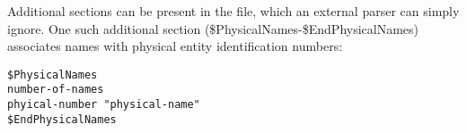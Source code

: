 Additional sections can be present in the file, which an external parser can simply ignore. One such additional section (\$PhysicalNames-\$EndPhysicalNames) associates names with physical entity identification numbers:
 	
\begin{verbatim}
$PhysicalNames
number-of-names
phyical-number "physical-name"
$EndPhysicalNames 
\end{verbatim}


